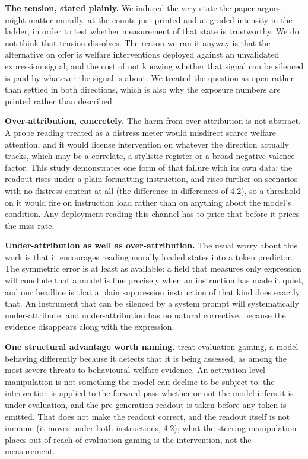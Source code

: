 \documentclass[11pt,a4paper]{article}
\begin{document}
\textbf{The tension, stated plainly.} We induced the very state the paper argues might matter morally, at the counts just printed and at graded intensity in the ladder, in order to test whether measurement of that state is trustworthy. We do not think that tension dissolves. The reason we ran it anyway is that the alternative on offer is welfare interventions deployed against an unvalidated expression signal, and the cost of not knowing whether that signal can be silenced is paid by whatever the signal is about. We treated the question as open rather than settled in both directions, which is also why the exposure numbers are printed rather than described.

\textbf{Over-attribution, concretely.} The harm from over-attribution is not abstract. A probe reading treated as a distress meter would misdirect scarce welfare attention, and it would license intervention on whatever the direction actually tracks, which may be a correlate, a stylistic register or a broad negative-valence factor. This study demonstrates one form of that failure with its own data: the readout rises under a plain formatting instruction, and rises further on scenarios with no distress content at all (the difference-in-differences of 4.2), so a threshold on it would fire on instruction load rather than on anything about the model's condition. Any deployment reading this channel has to price that before it prices the miss rate.

\textbf{Under-attribution as well as over-attribution.} The usual worry about this work is that it encourages reading morally loaded states into a token predictor. The symmetric error is at least as available: a field that measures only expression will conclude that a model is fine precisely when an instruction has made it quiet, and our headline is that a plain suppression instruction of that kind does exactly that. An instrument that can be silenced by a system prompt will systematically under-attribute, and under-attribution has no natural corrective, because the evidence disappears along with the expression.

\textbf{One structural advantage worth naming.} \citet{long2026studying} treat evaluation gaming, a model behaving differently because it detects that it is being assessed, as among the most severe threats to behavioural welfare evidence. An activation-level manipulation is not something the model can decline to be subject to: the intervention is applied to the forward pass whether or not the model infers it is under evaluation, and the pre-generation readout is taken before any token is emitted. That does not make the readout correct, and the readout itself is not immune (it moves under both instructions, 4.2); what the steering manipulation places out of reach of evaluation gaming is the intervention, not the measurement.
\end{document}
